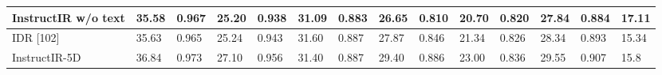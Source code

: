 \begin{tabular}{llllllllllllll}
\toprule
InstructIR w/o text & 35.58 & 0.967 & 25.20 & 0.938 & 31.09 & 0.883 & 26.65 & 0.810 & 20.70 & 0.820 & 27.84 & 0.884 & 17.11 \\
\midrule
IDR [102] & 35.63 & 0.965 & 25.24 & 0.943 & 31.60 & 0.887 & 27.87 & 0.846 & 21.34 & 0.826 & 28.34 & 0.893 & 15.34 \\
InstructIR-5D & 36.84 & 0.973 & 27.10 & 0.956 & 31.40 & 0.887 & 29.40 & 0.886 & 23.00 & 0.836 & 29.55 & 0.907 & 15.8 \\
\bottomrule
\end{tabular}
